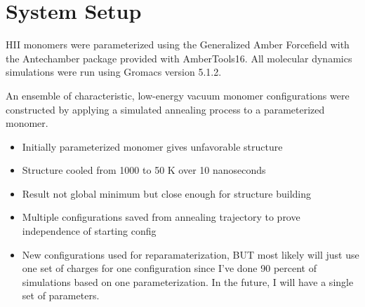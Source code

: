 \documentclass{article}
\begin{document}
	\section{System Setup}
	
	HII monomers were parameterized using the Generalized Amber Forcefield with the Antechamber package provided with AmberTools16. All molecular dynamics simulations were run using Gromacs version 5.1.2.

	An ensemble of characteristic, low-energy vacuum monomer configurations were constructed by applying a simulated annealing process to a parameterized monomer.
	\begin{itemize}
		\item Initially parameterized monomer gives unfavorable structure
		\item Structure cooled from 1000 to 50 K over 10 nanoseconds
		\item Result not global minimum but close enough for structure building
		\item Multiple configurations saved from annealing trajectory to prove independence of starting config
		\item New configurations used for reparamaterization, BUT most likely will just use one set of charges for one configuration since I've done 90 percent of simulations based on one parameterization. In the future, I will have a single set of parameters.
	\end{itemize}
\end{document}
